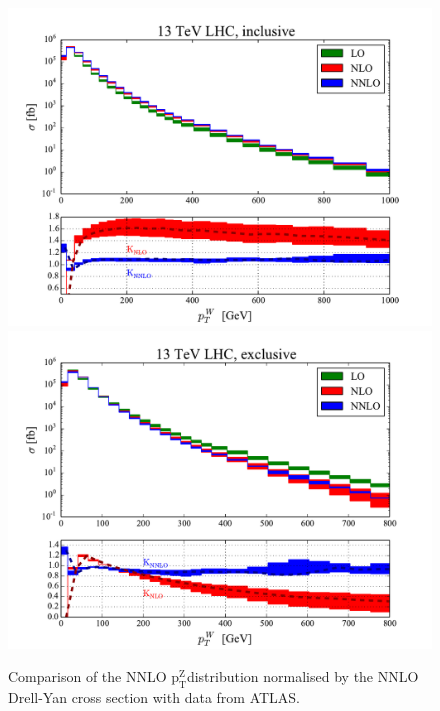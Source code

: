\documentclass[a4paper,11pt,notoc]{article}
\newcommand{\ptZ}{\ensuremath{\mathrm{p_T^{Z}}}}
\begin{document}
\begin{figure}[t!]
\centering
\includegraphics[width=0.495\columnwidth]{pTW_13TeV_incl.pdf} 
\includegraphics[width=0.495\columnwidth]{pTW_13TeV_excl.pdf} 
\caption{Comparison of the NNLO \ptZ distribution normalised by the NNLO Drell-Yan cross section with data from ATLAS.}
\label{fig:ptNNLO}
\end{figure}   
\end{document}
